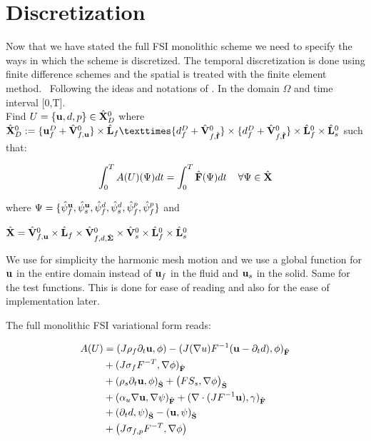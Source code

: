 \section{Discretization}
Now that we have stated the full FSI monolithic scheme we need to specify the ways in which the scheme is discretized. The temporal discretization is done using finite difference schemes and the spatial is treated with the finite element method.  \
Following the ideas and notations of \cite{Wick2011}. In the domain $\Omega$ and time interval [0,T]. \\
Find $ U = \{\bold{u}, d, p\} \in \hat{X}^0_D $ where $ \hat{X}^0_D := \{ \bold{u}^D_f + \hat{V}^0_{f,\bold{u}} \} \times \hat{L}_f \texttimes \{ d_f^D + \hat{V}^0_{f,\hat{f}} \} \times \{ d_f^D + \hat{V}^0_{f,\hat{f}} \} \times \hat{L}^0_f \times \hat{L}^0_s  $ such that:

\begin{equation}
\int_0^T A(U)(\Psi) dt = \int_0^T \hat{F}(\Psi) dt \hspace{4mm} \forall  \Psi \in \hat{X}
\end{equation}

where $ \Psi = \{  \hat{\psi}^\bold{u}_f, \hat{\psi}^\bold{u}_s, \hat{\psi}^d_f, \hat{\psi}^d_s, \hat{\psi}^p_f,\hat{\psi}^p_f  \}$ and

 $\hat{X} = \hat{V}^0_{f,\bold{u}} \times \hat{L}_f \times \hat{V}^0_{f,d,\hat{\Sigma}} \times \hat{V}_s^0 \times \hat{L}_f^0 \times \hat{L}_s^0  $


We use for simplicity the harmonic mesh motion and we use a global function for $\bold{u}$ in the entire domain instead of $\bold{u}_f$ in the fluid and $\bold{u}_s$ in the solid. Same for the test functions. This is done for ease of reading and also for the ease of implementation later.

The full monolithic FSI variational form reads:
  
\begin{align}
A(U)&= (J \rho_f \partial_t \bold{u} , \phi ) - (J (\nabla u)F^{-1}(\bold{u} - \partial_t d) , \phi )_{\mathcal{\hat{F}}}  \\
       &+ ( J \sigma_{f} F^{-T} , \nabla \phi )_{\mathcal{\hat{F}}} \\
       &+ (\rho_s \partial_t \bold{u} , \phi)_{\mathcal{\hat{S}}}   + \big(F S_s, \nabla \phi \big)_{\mathcal{\hat{S}}} \\
       &+ ( \alpha_u \nabla \bold{u}, \nabla \psi)_{\mathcal{\hat{F}}} + (\nabla \cdot (J F^{-1} \bold{u}),\gamma )_{\mathcal{\hat{F}}} \\
       &+ (\partial_t d , \psi)_{\mathcal{\hat{S}}}  - ( \bold{u} , \psi )_{\mathcal{\hat{S}}} \\ 
       &+  \big( J \sigma_{f,p} F^{-T}, \nabla \phi  \big) 	 		
\end{align}


